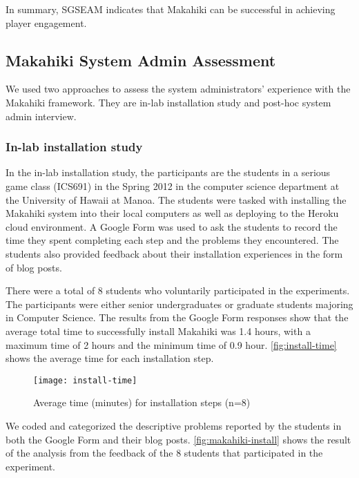 In summary, SGSEAM indicates that Makahiki can be successful in achieving player engagement.

\subsection{Makahiki System Admin Assessment}
We used two approaches to assess the system administrators' experience with the Makahiki framework. They are in-lab installation study and post-hoc system admin interview.

\subsubsection{In-lab installation study}

In the in-lab installation study, the participants are the students in a serious game class (ICS691) in the Spring 2012 in the computer science department at the University of Hawaii at Manoa. The students were tasked with installing the Makahiki system into their local computers as well as deploying to the Heroku cloud environment. A Google Form was used to ask the students to record the time they spent completing each step and the problems they encountered. The students also provided feedback about their installation experiences in the form of blog posts. 

There were a total of 8 students who voluntarily participated in the experiments.  The participants were either senior undergraduates or graduate students majoring in Computer Science. The results from the Google Form responses show that the average total time to successfully install
Makahiki was 1.4 hours, with a maximum time of 2 hours and the minimum time of 0.9 hour.
\autoref{fig:install-time} shows the average time for each installation step.

\begin{figure}[ht!]
  \center
  \texttt{[image: install-time]}
  \caption{Average time (minutes) for installation steps (n=8)}
  \label{fig:install-time}
\end{figure}

We coded and categorized the descriptive problems reported by the students in both the Google Form
and their blog posts. \autoref{fig:makahiki-install} shows the result of the analysis from
the feedback of the 8 students that participated in the experiment.

